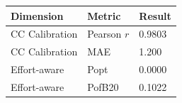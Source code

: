 \begin{tabular}{lll}
\toprule
Dimension & Metric & Result \\
\midrule
CC Calibration & Pearson $r$ & 0.9803 \\
CC Calibration & MAE & 1.200 \\
Effort-aware & Popt & 0.0000 \\
Effort-aware & PofB20 & 0.1022 \\
\bottomrule
\end{tabular}